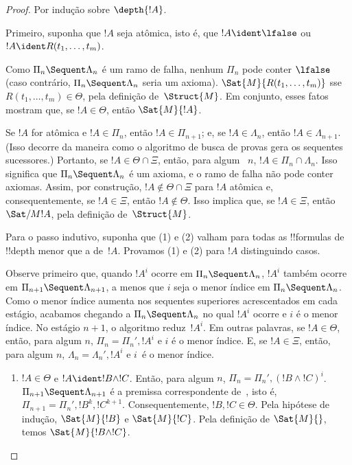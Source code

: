 \documentclass[../../../include/open-logic-section]{subfiles}
\begin{document}
\begin{proof}
  Por indução sobre $\depth{!A}$.

Primeiro, suponha que $!A$ seja atômica, isto é, que $!A \ident
\lfalse$ ou $!A \ident R(t_1, \dots, t_m)$.

Como $\Pi_n \Sequent \Lambda_n$ é um ramo de falha, nenhum $\Pi_n$
pode conter $\lfalse$ (caso contrário, $\Pi_n \Sequent \Lambda_n$
seria um axioma). $\Sat{M}{R(t_1, \dots, t_m)}$ sse $R(t_1, \dots,
t_m) \in \Theta$, pela definição de~$\Struct{M}$. Em conjunto, esses
fatos mostram que, se $!A \in \Theta$, então $\Sat{M}{!A}$.

Se $!A$ for atômica e $!A \in \Pi_n$, então $!A \in \Pi_{n+1}$; e,
se $!A \in \Lambda_n$, então $!A \in \Lambda_{n+1}$. (Isso decorre
da maneira como o algoritmo de busca de provas gera os sequentes
sucessores.) Portanto, se $!A \in \Theta \cap \Xi$, então, para algum
~$n$, $!A \in \Pi_n \cap \Lambda_n$. Isso significa que $\Pi_n
\Sequent \Lambda_n$ é um axioma, e o ramo de falha não pode conter
axiomas. Assim, por construção, $!A \notin \Theta \cap \Xi$ para
$!A$ atômica e, consequentemente, se $!A \in \Xi$, então $!A \notin
\Theta$. Isso implica que, se $!A \in \Xi$, então $\Sat/{M}{!A}$,
pela definição de~$\Struct{M}$.

Para o passo indutivo, suponha que (1) e (2) valham para todas as
!!{formula}s de !!{depth} menor que a de~$!A$. Provamos (1) e (2) para
$!A$ distinguindo casos.

Observe primeiro que, quando $!A^i$ ocorre em $\Pi_n \Sequent
\Lambda_n$, $!A^i$ também ocorre em $\Pi_{n+1} \Sequent
\Lambda_{n+1}$, a menos que $i$ seja o menor índice em $\Pi_n \Sequent
\Lambda_n$. Como o menor índice aumenta nos sequentes superiores
acrescentados em cada estágio, acabamos chegando a $\Pi_n \Sequent
\Lambda_n$ no qual $!A^i$ ocorre e $i$ é o menor índice. No estágio
$n+1$, o algoritmo reduz~$!A^i$. Em outras palavras, se $!A \in
\Theta$, então, para algum $n$, $\Pi_n = \Pi_n', !A^i$ e $i$ é o
menor índice. E, se $!A \in \Xi$, então, para algum $n$, $\Lambda_n =
\Lambda_n', !A^i$ e $i$~é o menor índice.

\begin{enumerate}
  \item $!A \in \Theta$ e $!A \ident !B \land !C$. Então, para algum
  $n$, $\Pi_n = \Pi_n', (!B \land !C)^i$. $\Pi_{n+1} \Sequent
  \Lambda_{n+1}$ é a premissa correspondente de~\LeftR{\land}, isto é,
  $\Pi_{n+1} = \Pi_n', !B^k, !C^{k+1}$. Consequentemente, $!B, !C \in
  \Theta$. Pela hipótese de indução, $\Sat{M}{!B}$ e $\Sat{M}{!C}$.
  Pela definição de $\Sat{M}{}$, temos $\Sat{M}{!B \land !C}$.


\end{enumerate}
\end{proof}
\end{document}
